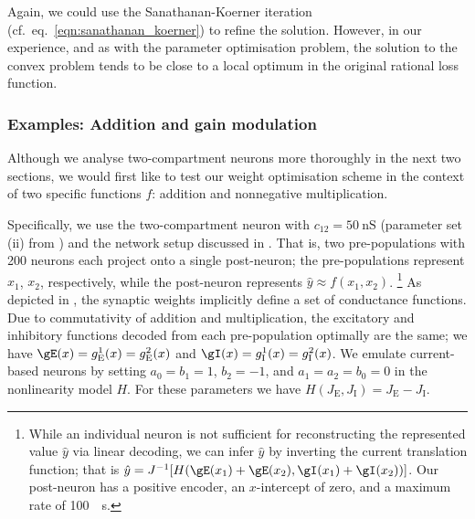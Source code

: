 Again, we could use the Sanathanan-Koerner iteration (cf.~eq.~\ref{eqn:sanathanan_koerner}) to refine the solution.
However, in our experience, and as with the parameter optimisation problem, the solution to the convex problem tends to be close to a local optimum in the original rational loss function.

\subsubsection{Examples: Addition and gain modulation}
Although we analyse two-compartment neurons more thoroughly in the next two sections, we would first like to test our weight optimisation scheme in the context of two specific functions $f$: addition and nonnegative multiplication.

Specifically, we use the two-compartment \LIF neuron with $c_{12} = \SI{50}{\nano\siemens}$ (parameter set (ii) from )
and the network setup discussed in
.
That is, two pre-populations with 200 neurons each project onto a single post-neuron; the pre-populations represent $x_1$, $x_2$, respectively, while the post-neuron represents $\hat y \approx f(x_1, x_2)$.%
\footnote{While an individual neuron is not sufficient for reconstructing the represented value $\hat y$ via linear decoding, we can infer $\hat y$ by inverting the current translation function; that is $\hat y = J^{-1}[H(\gE(x_1) + \gE(x_2), \gI(x_1) + \gI(x_2))]$.
Our post-neuron has a positive encoder, an $x$-intercept of zero, and a maximum rate of \SI{100}{\per\second}.
}
As depicted in , the synaptic weights implicitly define a set of conductance functions.
Due to commutativity of addition and multiplication, the excitatory and inhibitory functions decoded from each pre-population optimally are the same; we have $\gE(x) = g_\mathrm{E}^1(x) = g_\mathrm{E}^2(x)$ and $\gI(x) = g_\mathrm{I}^1(x) = g_\mathrm{I}^2(x)$.
We emulate current-based \LIF neurons by setting $a_0 = b_1 = 1$, $b_2 = -1$, and $a_1 = a_2 = b_0 = 0$ in the nonlinearity model $H$.
For these parameters we have $H(J_\mathrm{E}, J_\mathrm{I}) = J_\mathrm{E} - J_\mathrm{I}$.

